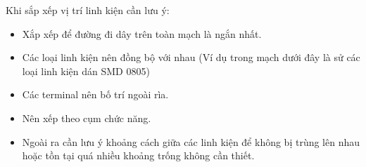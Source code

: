 \cleardoublepage
Khi sắp xếp vị trí linh kiện cần lưu ý:
\begin{itemize}
    \item Xắp xếp để đường đi dây trên toàn mạch là ngắn nhất.
    \item Các loại linh kiện nên đồng bộ với nhau (Ví dụ trong mạch dưới đây là sử các loại linh kiện dán SMD 0805)
    \item Các terminal nên bố trí ngoài rìa. 
    \item Nên xếp theo cụm chức năng.
    \item Ngoài ra cần lưu ý khoảng cách giữa các linh kiện để không bị trùng lên nhau hoặc tồn tại quá nhiều khoảng trống không cần thiết.
\end{itemize}   
